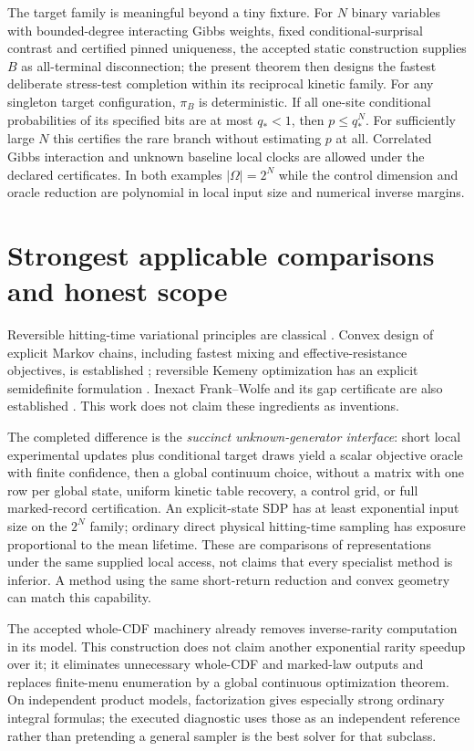 \documentclass[11pt]{article}
\begin{document}
The target family is meaningful beyond a tiny fixture. For $N$ binary
variables with bounded-degree interacting Gibbs weights, fixed
conditional-surprisal contrast and certified pinned uniqueness, the
accepted static construction supplies $B$ as all-terminal disconnection;
the present theorem then designs the fastest deliberate stress-test
completion within its reciprocal kinetic family. For any singleton
target configuration, $\pi_B$ is deterministic. If all one-site
conditional probabilities of its specified bits are at most
$q_*<1$, then $p\le q_*^N$. For sufficiently large $N$ this certifies
the rare branch without estimating $p$ at all. Correlated Gibbs
interaction and unknown baseline local clocks are allowed under the
declared certificates. In both examples $|\Omega|=2^N$ while the
control dimension and oracle reduction are polynomial in local input
size and numerical inverse margins.

\section{Strongest applicable comparisons and honest scope}
Reversible hitting-time variational principles are classical
\cite{aldous}. Convex design of explicit Markov chains, including
fastest mixing and effective-resistance objectives, is established
\cite{boyd}; reversible Kemeny optimization has an explicit semidefinite
formulation \cite{patel}. Inexact Frank--Wolfe and its gap certificate are
also established \cite{jaggi}. This work does not claim these ingredients
as inventions.

The completed difference is the \emph{succinct unknown-generator
interface}: short local experimental updates plus conditional target
draws yield a scalar objective oracle with finite confidence, then a
global continuum choice, without a matrix with one row per global state,
uniform kinetic table recovery, a control grid, or full marked-record
certification. An explicit-state SDP has at least exponential input
size on the $2^N$ family; ordinary direct physical hitting-time sampling
has exposure proportional to the mean lifetime. These are comparisons
of representations under the same supplied local access, not claims
that every specialist method is inferior. A method using the same
short-return reduction and convex geometry can match this capability.

The accepted whole-CDF machinery already removes inverse-rarity
computation in its model. This construction does not claim another
exponential rarity speedup over it; it eliminates unnecessary whole-CDF
and marked-law outputs and replaces finite-menu enumeration by a global
continuous optimization theorem. On independent product models,
factorization gives especially strong ordinary integral formulas; the
executed diagnostic uses those as an independent reference rather than
pretending a general sampler is the best solver for that subclass.
\end{document}
